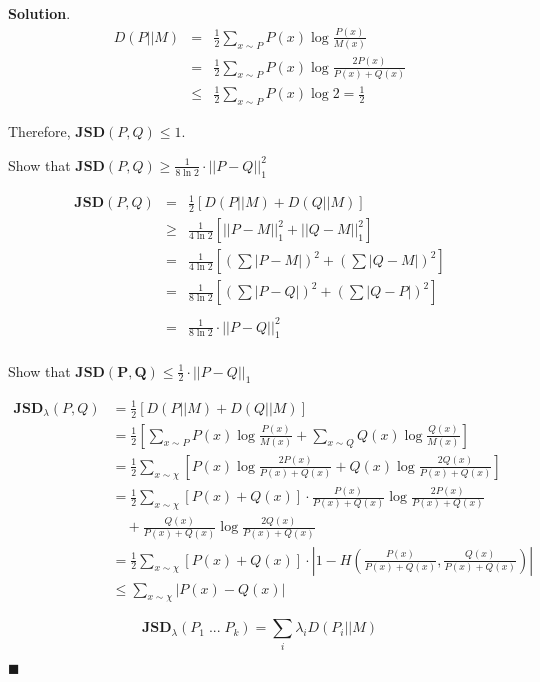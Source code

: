 \documentclass[12pt]{article}
\theoremstyle{definition}
\newenvironment{s}{%
        \begin{trivlist} \item \textbf{Solution}. }{%
            \hspace*{\fill} $\blacksquare$\end{trivlist}}%
\begin{document}
{\begin{s}
\begin{eqnarray*}
D(P||M) &=& \frac{1}{2}\sum_{x\sim P} P(x)\log \frac{P(x)}{M(x)}\\
&=&  \frac{1}{2}\sum_{x\sim P} P(x)\log \frac{2P(x)}{P(x)+Q(x)}\\
&\leq &  \frac{1}{2}\sum_{x\sim P} P(x)\log 2 = \frac{1}{2}
\end{eqnarray*}

Therefore, $\mathbf{JSD}(P,Q) \leq 1$.

Show that $\mathbf{JSD}(P,Q) \geq \frac{1}{8\ln 2} \cdot ||P-Q||_{1}^{2}$

\begin{eqnarray*}
\mathbf{JSD}(P,Q) &=&  \frac{1}{2}\left[D(P||M) + D(Q||M)\right]\\
&\geq & \frac{1}{4\ln 2}\left[||P-M||_{1}^{2} + ||Q-M||_{1}^{2}\right]\\
&= & \frac{1}{4\ln 2}\left[\left(\sum |P-M|\right)^{2} + \left(\sum |Q-M|\right)^{2} \right]\\ &= & \frac{1}{8\ln 2}\left[\left(\sum |P-Q|\right)^{2} + \left(\sum |Q-P|\right)^{2} \right]\\
\\ &= & \frac{1}{8\ln 2} \cdot ||P-Q||_{1}^{2}\\
\end{eqnarray*}

Show that $\mathbf{JSD(P,Q)} \leq \frac{1}{2}\cdot ||P-Q||_{1}$ 

\begin{align*}
\mathbf{JSD}_{\lambda}(P,Q) &=  \frac{1}{2}\left[D(P||M) + D(Q||M)\right]\\
&= \frac{1}{2}\left[\sum_{x\sim P} P(x)\log\frac{P(x)}{M(x)} + \sum_{x\sim Q} Q(x)\log\frac{Q(x)}{M(x)}\right]\\
&= \frac{1}{2}\sum_{x\sim \chi}\left[P(x)\log\frac{2P(x)}{P(x)+Q(x)} + Q(x)\log\frac{2Q(x)}{P(x)+Q(x)} \right]\\
&= \frac{1}{2}\sum_{x\sim \chi}\left[P(x)+Q(x)\right]\cdot\frac{P(x)}{P(x)+Q(x)}\log\frac{2P(x)}{P(x)+Q(x)}\\
&\quad + \frac{Q(x)}{P(x)+Q(x)}\log\frac{2Q(x)}{P(x)+Q(x)}\\
&= \frac{1}{2}\sum_{x\sim \chi}\left[P(x)+Q(x)\right] \cdot |1-H\left(\frac{P(x)}{P(x)+Q(x)},\frac{Q(x)}{P(x)+Q(x)}\right)|\\
&\leq \sum_{x\sim \chi} |P(x)-Q(x)|
\end{align*}


\begin{equation*}
\mathbf{JSD}_{\lambda}(P_{1} \; ... \; P_{k}) =  \sum_{i} \lambda_{i}D(P_{i}||M)
\end{equation*}


\end{s}}
\end{document}
